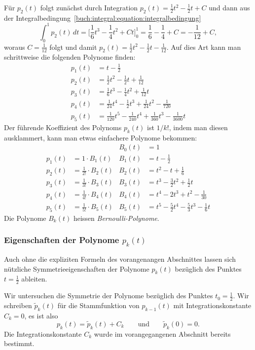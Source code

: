 Für $p_2(t)$ folgt zunächst durch Integration $p_2(t)=\frac12t^2-\frac12t+C$
und dann aus der
Integralbedingung~\eqref{buch:integral:equation:integralbedingung}
\[
\int_0^1 p_2(t) \,dt
=
\biggl[
\frac16t^3-\frac14t^2+Ct
\biggr]_0^1
=
\frac16-\frac14+C
=
-\frac1{12}+C,
\]
woraus $C=\frac1{12}$ folgt und damit
$p_2(t) = \frac12t^2 -\frac12t-\frac1{12}$.
Auf dies Art kann man schrittweise die folgenden Polynome finden:
\begin{align*}
p_1(t)
&=
t-\frac12
\\
p_2(t)
&=
\frac12t^2 - \frac12t +\frac1{12}
\\
p_3(t)
&= 
\frac16t^3 - \frac14t^2 +\frac1{12}t
\\
p_4(t)
&=
\frac1{24}t^4-\frac12t^3 + \frac1{24} t^2 - \frac1{720}
\\
p_5(t)
&=
\frac1{120}t^5 - \frac{1}{240} t^4+\frac1{360} t^3 -\frac1{3600}t
\end{align*}
Der führende Koeffizient des Polynoms $p_k(t)$ ist $1/k!$, indem man
diesen ausklammert, kann man etwas einfachere Polynome bekommen:
\begin{align*}
       &                         & B_0(t) &= 1                                \\
p_1(t) &= 1         \cdot B_1(t) & B_1(t) &= t -\frac12                       \\
p_2(t) &= \frac1{2!}\cdot B_2(t) & B_2(t) &= t^2 - t + \frac16                \\
p_3(t) &= \frac1{3!}\cdot B_3(t) & B_3(t) &= t^3-\frac32 t^2+\frac12t         \\
p_4(t) &= \frac1{4!}\cdot B_4(t) & B_4(t) &= t^4-2t^3+t^2-\frac1{30}          \\
p_5(t) &= \frac1{5!}\cdot B_5(t) & B_5(t) &= t^5-\frac52t^4-\frac53t^3-\frac16t
\end{align*}
Die Polynome $B_k(t)$ heissen {\em Bernoulli-Polynome}.
%

\subsubsection{Eigenschaften der Polynome $p_k(t)$}
Auch ohne die expliziten Formeln des vorangenangen Abschnittes lassen sich
nützliche Symmetrieeigenschaften der Polynome $p_k(t)$ bezüglich des
Punktes $t=\frac12$ ableiten.
%

Wir untersuchen die Symmetrie der Polynome bezüglich des Punktes
$t_0=\frac12$.
Wir schreiben $\tilde{p}_k(t)$ für die Stammfunktion von $p_{k-1}(t)$ 
mit Integrationskonstante $C_k=0$, es ist also
%
%
\[
p_k(t) = \tilde{p}_k(t) + C_k
\qquad\text{und}\qquad
\tilde{p}_k(0)=0.
\]
Die Integrationskonstante $C_k$ wurde im vorangegangenen Abschnitt
bereits bestimmt.

